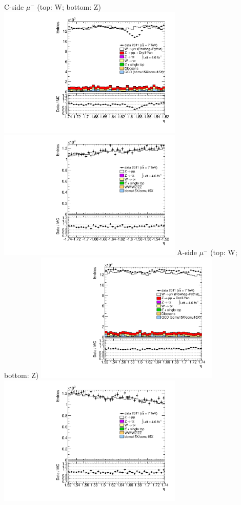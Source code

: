  {
\colb[T]
C-side $\mu^{-}$ (top: W; bottom: Z)
\centering
\includegraphics[width=0.66\textwidth]{dates/20130306/figures/both/W_8_C_stack_l_eta_POS} \\
\includegraphics[width=0.66\textwidth]{dates/20130306/figures/both/Z_8_C_stack_lP_eta_ALL.pdf}
A-side $\mu^{-}$ (top: W; bottom: Z)
\centering
\includegraphics[width=0.66\textwidth]{dates/20130306/figures/both/W_8_A_stack_l_eta_POS} \\
\includegraphics[width=0.66\textwidth]{dates/20130306/figures/both/Z_8_A_stack_lP_eta_ALL.pdf} 
\cole
}
